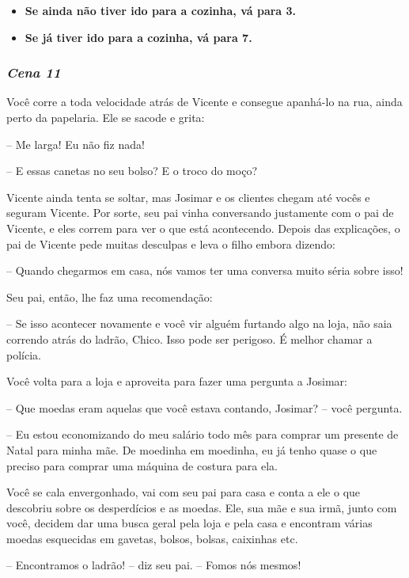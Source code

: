 \begin{itemize}
	\item \textbf{Se ainda não tiver ido para a cozinha, vá para 3.}
	\item \textbf{Se já tiver ido para a cozinha, vá para 7.}
\end{itemize}

\bigskip\medskip

\subsubsection{\textit{\textbf{Cena 11}}}
Você corre a toda velocidade atrás de Vicente e consegue apanhá-lo na rua, ainda perto da papelaria. Ele se sacode e grita:

-- Me larga! Eu não fiz nada!

-- E essas canetas no seu bolso? E o troco do moço?

Vicente ainda tenta se soltar, mas Josimar e os clientes chegam até vocês e seguram Vicente. Por sorte, seu pai vinha conversando justamente com o pai de Vicente, e eles correm para ver o que está acontecendo. Depois das explicações, o pai de Vicente pede muitas desculpas e leva o filho embora dizendo:

-- Quando chegarmos em casa, nós vamos ter uma conversa muito séria sobre isso!

Seu pai, então, lhe faz uma recomendação:

-- Se isso acontecer novamente e você vir alguém furtando algo na loja, não saia correndo atrás do ladrão, Chico. Isso pode ser perigoso. É melhor chamar a polícia.

Você volta para a loja e aproveita para fazer uma pergunta a Josimar:

-- Que moedas eram aquelas que você estava contando, Josimar? -- você pergunta.

-- Eu estou economizando do meu salário todo mês para comprar um presente de Natal para minha mãe. De moedinha em moedinha, eu já tenho quase o que preciso para comprar uma máquina de costura para ela.

Você se cala envergonhado, vai com seu pai para casa e conta a ele o que descobriu sobre os desperdícios e as moedas. Ele, sua mãe e sua irmã, junto com você, decidem dar uma busca geral pela loja e pela casa e encontram várias moedas esquecidas em gavetas, bolsos, bolsas, caixinhas etc.

-- Encontramos o ladrão! -- diz seu pai. -- Fomos nós mesmos!

